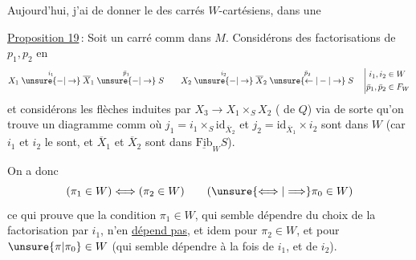 
Aujourd'hui, j'ai  de donner le  des carrés $W$-cartésiens, dans une

\uline{Proposition 19}\,: Soit
un carré comm dans $M$. Considérons des factorisations de $p_1,p_2$ en
\[
X_1\mathrel{\overset{i_1}{\unsure{-|\to}}}\overline X_1\mathrel{\overset{\bar p_1}{\unsure{-|\to}}}S
\qquad X_2\mathrel{\overset{i_2}{\unsure{-|\to}}}\overline X_2\mathrel{\overset{\bar p_2}{\unsure{\leftarrow|-|\to}}}S
\quad\left|\begin{aligned}i_1,i_2&\in W\\ \bar p_1,\bar p_2&\in F_W\end{aligned}\right.
\]
et considérons les flèches induites par $X_3\to X_1\times_S X_2$ ( de $Q$) via
de sorte qu'on trouve  un diagramme comm
où $j_1=i_1\times_S\mathrm{id}_{\overline X_2}$ et $j_2=\mathrm{id}_{\overline X_1}\mathbin{\times}i_2$ sont dans $W$ (car $i_1$ et $i_2$ le sont, et $\overline X_1$ et $\overline X_2$ sont dans $\underline{\mathrm{Fib}}_W S$).

On a donc
\[
(\pi_1\in W)\Longleftrightarrow(\pi_2\in W)\qquad(\unsure{\Longleftrightarrow|\Longrightarrow}\pi_0\in W)
\]
ce qui prouve que la condition $\pi_1\in W$, qui semble dépendre du choix de la factorisation par $i_1$, n'en \uline{dépend pas}, et idem pour $\pi_2\in W$, et pour $\unsure{\pi|\pi_0}\in W$ (qui semble dépendre à la fois de $i_1$, et de $i_2$).
